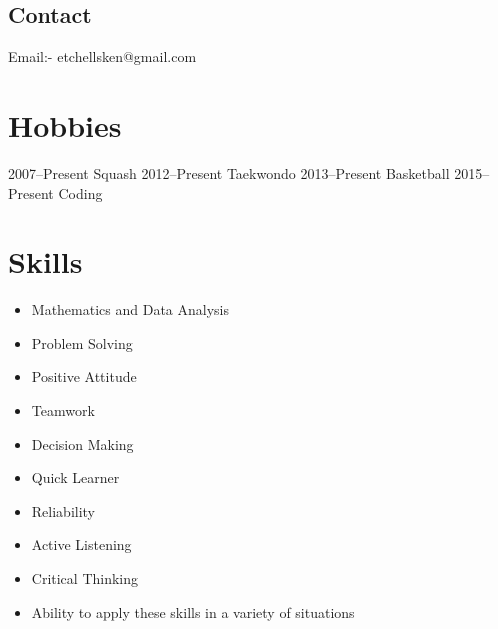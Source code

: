 \documentclass[]{cv-style}          %
\begin{document}

\newpage




\begin{aside}
%
\section{Contact}
Email:-
etchellsken@gmail.com
%
\end{aside}


\section{Hobbies}
\begin{entrylist}
    \entry
            {2007--Present}
            {Squash}{}{}
    \entry
            {2012--Present}
            {Taekwondo}{}
            {}
    \entry
            {2013--Present}
            {Basketball}{}{}
    \entry
        {2015--Present}
        {Coding}{}{}
\end{entrylist}

\section{Skills}
\begin{itemize}
    \item Mathematics and Data Analysis
    \item Problem Solving
    \item Positive Attitude
    \item Teamwork
    \item Decision Making
    \item Quick Learner
    \item Reliability
    \item Active Listening
    \item Critical Thinking
    \item Ability to apply these skills in a variety of situations
\end{itemize}
\end{document}
